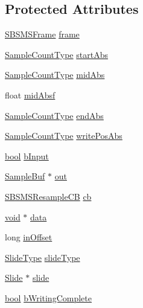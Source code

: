 \subsection*{Protected Attributes}
\begin{DoxyCompactItemize}
\item 
\hyperlink{struct__sbsms___1_1_s_b_s_m_s_frame}{S\+B\+S\+M\+S\+Frame} \hyperlink{class__sbsms___1_1_resampler_imp_a12d1e5b4bfc170a501b6c90c504ab488}{frame}
\item 
\hyperlink{namespace__sbsms___ae4ba47977e7e07f5945e529e2256b662}{Sample\+Count\+Type} \hyperlink{class__sbsms___1_1_resampler_imp_a268200edd9d2395c6200be673b00a10c}{start\+Abs}
\item 
\hyperlink{namespace__sbsms___ae4ba47977e7e07f5945e529e2256b662}{Sample\+Count\+Type} \hyperlink{class__sbsms___1_1_resampler_imp_a1c502c2dd2b59085e9a7472db873ddf9}{mid\+Abs}
\item 
float \hyperlink{class__sbsms___1_1_resampler_imp_ac0c741b4d1413ecea78fafe81240cf5c}{mid\+Absf}
\item 
\hyperlink{namespace__sbsms___ae4ba47977e7e07f5945e529e2256b662}{Sample\+Count\+Type} \hyperlink{class__sbsms___1_1_resampler_imp_ad2280684e85163ae63c31f42e92f78a6}{end\+Abs}
\item 
\hyperlink{namespace__sbsms___ae4ba47977e7e07f5945e529e2256b662}{Sample\+Count\+Type} \hyperlink{class__sbsms___1_1_resampler_imp_a833e3e7d22aaa1322fa676b0a170beab}{write\+Pos\+Abs}
\item 
\hyperlink{mac_2config_2i386_2lib-src_2libsoxr_2soxr-config_8h_abb452686968e48b67397da5f97445f5b}{bool} \hyperlink{class__sbsms___1_1_resampler_imp_a6c5b5954b1ff67b7cde1c8afe2d3dfd6}{b\+Input}
\item 
\hyperlink{namespace__sbsms___a8cd0992a16c2cc5448b63d446239c196}{Sample\+Buf} $\ast$ \hyperlink{class__sbsms___1_1_resampler_imp_a2b0b3479502141d4019a4f70dacef473}{out}
\item 
\hyperlink{namespace__sbsms___a1b88e19baa604934b1c3cdec1fae8d4b}{S\+B\+S\+M\+S\+Resample\+CB} \hyperlink{class__sbsms___1_1_resampler_imp_a71b316bd1ac799008bfe234216c24009}{cb}
\item 
\hyperlink{sound_8c_ae35f5844602719cf66324f4de2a658b3}{void} $\ast$ \hyperlink{class__sbsms___1_1_resampler_imp_a11c42eb62e73bc519ff88f764d20875b}{data}
\item 
long \hyperlink{class__sbsms___1_1_resampler_imp_a787601fd02f94f2c3f4329f05c799add}{in\+Offset}
\item 
\hyperlink{namespace__sbsms___a208fc16133e115cda214f563a3a19a49}{Slide\+Type} \hyperlink{class__sbsms___1_1_resampler_imp_ab16a2cd83f35754395686dbd7357af1f}{slide\+Type}
\item 
\hyperlink{class__sbsms___1_1_slide}{Slide} $\ast$ \hyperlink{class__sbsms___1_1_resampler_imp_a723bbf87c30922e5252767a6a31f3362}{slide}
\item 
\hyperlink{mac_2config_2i386_2lib-src_2libsoxr_2soxr-config_8h_abb452686968e48b67397da5f97445f5b}{bool} \hyperlink{class__sbsms___1_1_resampler_imp_af2cd791c74515334ac808127c2331010}{b\+Writing\+Complete}
\end{DoxyCompactItemize}



